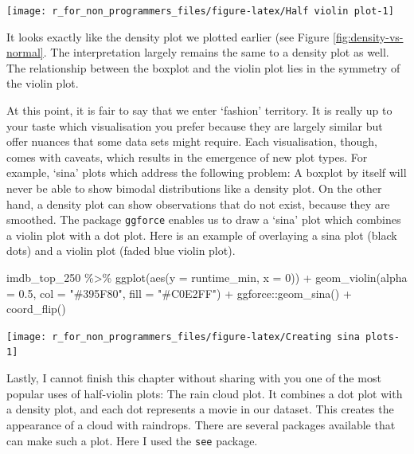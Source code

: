 \documentclass[
]{book}
\newenvironment{Shaded}{\begin{snugshade}}{\end{snugshade}}
\newcommand{\AttributeTok}[1]{\textcolor[rgb]{0.77,0.63,0.00}{#1}}
\newcommand{\DecValTok}[1]{\textcolor[rgb]{0.00,0.00,0.81}{#1}}
\newcommand{\FloatTok}[1]{\textcolor[rgb]{0.00,0.00,0.81}{#1}}
\newcommand{\FunctionTok}[1]{\textcolor[rgb]{0.00,0.00,0.00}{#1}}
\newcommand{\NormalTok}[1]{#1}
\newcommand{\SpecialCharTok}[1]{\textcolor[rgb]{0.00,0.00,0.00}{#1}}
\newcommand{\StringTok}[1]{\textcolor[rgb]{0.31,0.60,0.02}{#1}}
\begin{document}
\begin{center}\texttt{[image: r\_for\_non\_programmers\_files/figure-latex/Half violin plot-1]} \end{center}

It looks exactly like the density plot we plotted earlier (see Figure \ref{fig:density-vs-normal}. The interpretation largely remains the same to a density plot as well. The relationship between the boxplot and the violin plot lies in the symmetry of the violin plot.

At this point, it is fair to say that we enter `fashion' territory. It is really up to your taste which visualisation you prefer because they are largely similar but offer nuances that some data sets might require. Each visualisation, though, comes with caveats, which results in the emergence of new plot types. For example, `sina' plots which address the following problem: A boxplot by itself will never be able to show bimodal distributions like a density plot. On the other hand, a density plot can show observations that do not exist, because they are smoothed. The package \texttt{ggforce} enables us to draw a `sina' plot which combines a violin plot with a dot plot. Here is an example of overlaying a sina plot (black dots) and a violin plot (faded blue violin plot).

\begin{Shaded}
\begin{Highlighting}[]
\NormalTok{imdb\_top\_250 }\SpecialCharTok{\%\textgreater{}\%}
  \FunctionTok{ggplot}\NormalTok{(}\FunctionTok{aes}\NormalTok{(}\AttributeTok{y =}\NormalTok{ runtime\_min, }\AttributeTok{x =} \DecValTok{0}\NormalTok{)) }\SpecialCharTok{+}
  \FunctionTok{geom\_violin}\NormalTok{(}\AttributeTok{alpha =} \FloatTok{0.5}\NormalTok{, }\AttributeTok{col =} \StringTok{"\#395F80"}\NormalTok{, }\AttributeTok{fill =} \StringTok{"\#C0E2FF"}\NormalTok{) }\SpecialCharTok{+}
\NormalTok{  ggforce}\SpecialCharTok{::}\FunctionTok{geom\_sina}\NormalTok{() }\SpecialCharTok{+}
  \FunctionTok{coord\_flip}\NormalTok{()}
\end{Highlighting}
\end{Shaded}

\begin{center}\texttt{[image: r\_for\_non\_programmers\_files/figure-latex/Creating sina plots-1]} \end{center}

Lastly, I cannot finish this chapter without sharing with you one of the most popular uses of half-violin plots: The rain cloud plot. It combines a dot plot with a density plot, and each dot represents a movie in our dataset. This creates the appearance of a cloud with raindrops. There are several packages available that can make such a plot. Here I used the \texttt{see} package.
\end{document}
